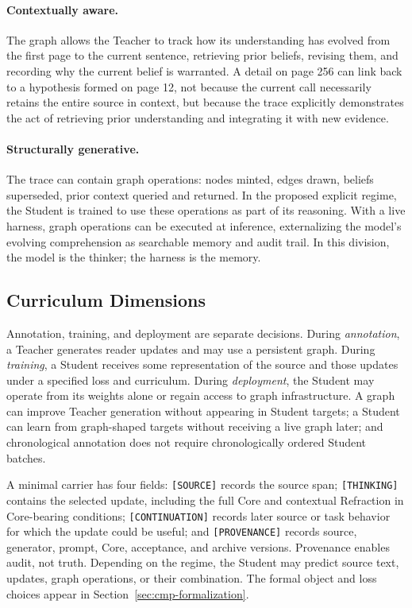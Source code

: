 \documentclass[11pt]{article}
\begin{document}
\paragraph{Contextually aware.} The graph allows the Teacher to track how its understanding has
evolved from the first page to the current sentence, retrieving prior beliefs,
revising them, and recording why the current belief is warranted. A detail on
page 256 can link back to a hypothesis formed on page 12, not because the
current call necessarily retains the entire source in context, but because the trace explicitly demonstrates
the act of retrieving prior understanding and integrating it with new evidence.

\paragraph{Structurally generative.} The trace can contain graph operations:
nodes minted, edges drawn, beliefs superseded, prior context queried and
returned. In the proposed explicit regime, the Student is trained to use these
operations as part of its reasoning. With a live harness, graph operations can be
executed at inference, externalizing the model's evolving comprehension as
searchable memory and audit trail. In this division, the model is the thinker;
the harness is the memory.

\subsection{Curriculum Dimensions}\label{sec:concept-to-curriculum}

Annotation, training, and deployment are separate decisions. During
\emph{annotation}, a Teacher generates reader updates and may use a persistent
graph. During \emph{training}, a Student receives some representation of the
source and those updates under a specified loss and curriculum. During
\emph{deployment}, the Student may operate from its weights alone or regain
access to graph infrastructure. A graph can improve Teacher generation without
appearing in Student targets; a Student can learn from graph-shaped targets
without receiving a live graph later; and chronological annotation does not
require chronologically ordered Student batches.

A minimal carrier has four fields: \texttt{[SOURCE]} records the source
span; \texttt{[THINKING]} contains the selected update, including the full Core
and contextual Refraction in Core-bearing conditions;
\texttt{[CONTINUATION]} records later source or task behavior for which the
update could be useful; and \texttt{[PROVENANCE]} records source, generator,
prompt, Core, acceptance, and archive versions. Provenance enables audit,
not truth. Depending on the regime, the Student may predict source text,
updates, graph operations, or their combination. The formal object and loss
choices appear in Section~\ref{sec:cmp-formalization}.
\end{document}
